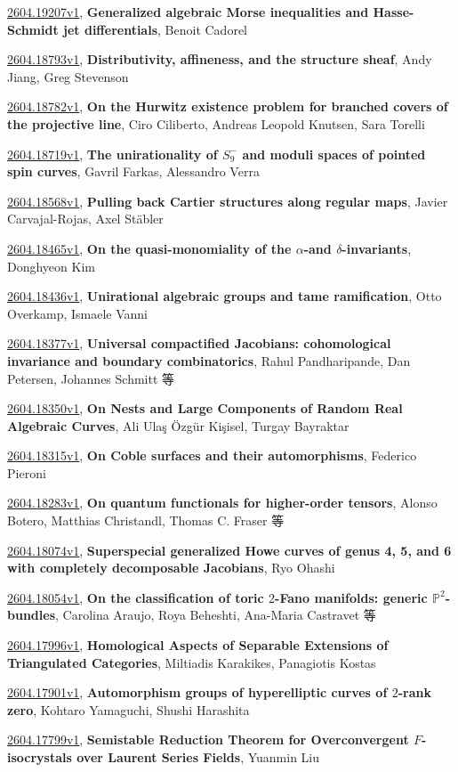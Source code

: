 \documentclass[9pt, a4paper]{article}
\theoremstyle{plain}
\theoremstyle{definition}
\theoremstyle{remark}
\newcommand{\arxiv}[3]{\href{https://arxiv.org/abs/#1}{#1}, \textbf{\textcolor{arxivblue}{#2}}, #3}
\begin{document}
\arxiv{2604.19207v1}{Generalized algebraic Morse inequalities and Hasse-Schmidt jet differentials}{Benoit Cadorel}

\arxiv{2604.18793v1}{Distributivity, affineness, and the structure sheaf}{Andy Jiang, Greg Stevenson}

\arxiv{2604.18782v1}{On the Hurwitz existence problem for branched covers of the projective line}{Ciro Ciliberto, Andreas Leopold Knutsen, Sara Torelli}

\arxiv{2604.18719v1}{The unirationality of $S_9^-$ and moduli spaces of pointed spin curves}{Gavril Farkas, Alessandro Verra}

\arxiv{2604.18568v1}{Pulling back Cartier structures along regular maps}{Javier Carvajal-Rojas, Axel Stäbler}

\arxiv{2604.18465v1}{On the quasi-monomiality of the $α$-and $δ$-invariants}{Donghyeon Kim}

\arxiv{2604.18436v1}{Unirational algebraic groups and tame ramification}{Otto Overkamp, Ismaele Vanni}

\arxiv{2604.18377v1}{Universal compactified Jacobians: cohomological invariance and boundary combinatorics}{Rahul Pandharipande, Dan Petersen, Johannes Schmitt 等}

\arxiv{2604.18350v1}{On Nests and Large Components of Random Real Algebraic Curves}{Ali Ulaş Özgür Kişisel, Turgay Bayraktar}

\arxiv{2604.18315v1}{On Coble surfaces and their automorphisms}{Federico Pieroni}

\arxiv{2604.18283v1}{On quantum functionals for higher-order tensors}{Alonso Botero, Matthias Christandl, Thomas C. Fraser 等}

\arxiv{2604.18074v1}{Superspecial generalized Howe curves of genus 4, 5, and 6 with completely decomposable Jacobians}{Ryo Ohashi}

\arxiv{2604.18054v1}{On the classification of toric $2$-Fano manifolds: generic $\mathbb{P}^2$-bundles}{Carolina Araujo, Roya Beheshti, Ana-Maria Castravet 等}

\arxiv{2604.17996v1}{Homological Aspects of Separable Extensions of Triangulated Categories}{Miltiadis Karakikes, Panagiotis Kostas}

\arxiv{2604.17901v1}{Automorphism groups of hyperelliptic curves of $2$-rank zero}{Kohtaro Yamaguchi, Shushi Harashita}

\arxiv{2604.17799v1}{Semistable Reduction Theorem for Overconvergent $F$-isocrystals over Laurent Series Fields}{Yuanmin Liu}
\end{document}
